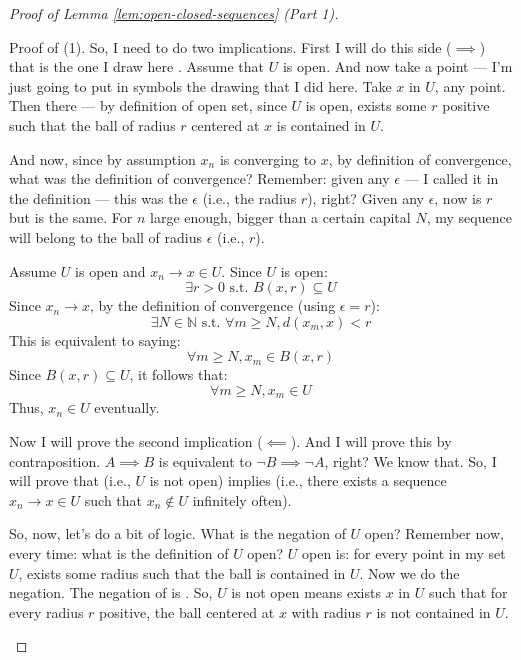 \begin{proof}[Proof of Lemma \ref{lem:open-closed-sequences} (Part 1)]
\begin{spoken-clean}[00:12:10 - 00:15:50]
Proof of (1). So, I need to do two implications. First I will do this side ($\implies$) that is the one I draw here . Assume that $U$ is open. And now take a point --- I'm just going to put in symbols the drawing that I did here. Take $x$ in $U$, any point. Then there --- by definition of open set, since $U$ is open, exists some $r$ positive such that the ball of radius $r$ centered at $x$ is contained in $U$. 

And now, since by assumption $x_n$ is converging to $x$, by definition of convergence, what was the definition of convergence? Remember: given any $\epsilon$ --- I called it in the definition --- this was the $\epsilon$ (i.e., the radius $r$), right? Given any $\epsilon$, now is $r$ but is the same. For $n$ large enough, bigger than a certain capital $N$, my sequence will belong to the ball of radius $\epsilon$ (i.e., $r$).
\end{spoken-clean}

\begin{math-stroke}[Forward Implication \texorpdfstring{$\implies$}{=>}]
Assume $U$ is open and $x_n \to x \in U$.
Since $U$ is open:
\[ \exists r > 0 \text{ s.t. } B(x, r) \subseteq U \]
Since $x_n \to x$, by the definition of convergence (using $\epsilon = r$):
\[ \exists N \in \mathbb{N} \text{ s.t. } \forall m \ge N, d(x_m, x) < r \]
This is equivalent to saying:
\[ \forall m \ge N, x_m \in B(x, r) \]
Since $B(x, r) \subseteq U$, it follows that:
\[ \forall m \ge N, x_m \in U \]
Thus, $x_n \in U$ eventually.
\end{math-stroke}

\begin{spoken-clean}[00:15:50 - 00:18:16]
Now I will prove the second implication ($\impliedby$). And I will prove this by contraposition. $A \implies B$ is equivalent to $\neg B \implies \neg A$, right? We know that. So, I will prove that  (i.e., $U$ is not open) implies  (i.e., there exists a sequence $x_n \to x \in U$ such that $x_n \notin U$ infinitely often).

So, now, let's do a bit of logic. What is the negation of $U$ open? Remember now, every time: what is the definition of $U$ open? $U$ open is: for every point in my set $U$, exists some radius such that the ball is contained in $U$. Now we do the negation. The negation of  is . So, $U$ is not open means exists $x$ in $U$ such that for every radius $r$ positive, the ball centered at $x$ with radius $r$ is not contained in $U$.
\end{spoken-clean}


\end{proof}
